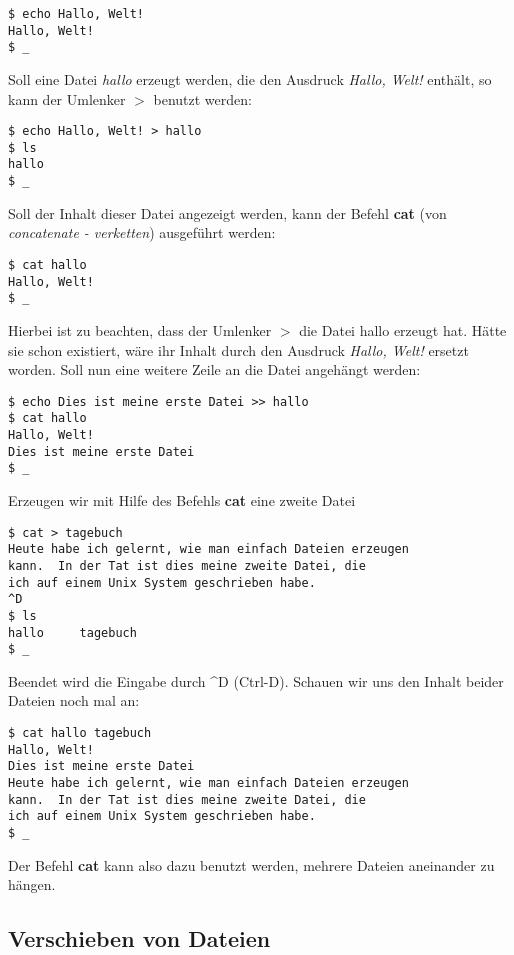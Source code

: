 \documentclass[titlepage,a4paper]{article}
\begin{document}
\begin{verbatim}
$ echo Hallo, Welt!
Hallo, Welt!
$ _
\end{verbatim}

Soll eine Datei \emph{hallo} erzeugt werden, die den Ausdruck \emph{Hallo,
  Welt!} enthält, so kann der Umlenker $>$ benutzt werden:

\begin{verbatim}
$ echo Hallo, Welt! > hallo
$ ls
hallo
$ _
\end{verbatim}

Soll der Inhalt dieser Datei angezeigt werden, kann der Befehl \textbf{cat}
(von \emph{concatenate - verketten}) ausgeführt werden:

\begin{verbatim}
$ cat hallo
Hallo, Welt!
$ _
\end{verbatim}

Hierbei ist zu beachten, dass der Umlenker $>$ die Datei hallo erzeugt hat.
Hätte sie schon existiert, wäre ihr Inhalt durch den Ausdruck \emph{Hallo,
  Welt!} ersetzt worden.  Soll nun eine weitere Zeile an die Datei angehängt
werden: 

\begin{verbatim}
$ echo Dies ist meine erste Datei >> hallo
$ cat hallo
Hallo, Welt!
Dies ist meine erste Datei
$ _
\end{verbatim}

Erzeugen wir mit Hilfe des Befehls \textbf{cat} eine zweite Datei

\begin{verbatim}
$ cat > tagebuch
Heute habe ich gelernt, wie man einfach Dateien erzeugen
kann.  In der Tat ist dies meine zweite Datei, die
ich auf einem Unix System geschrieben habe.
^D
$ ls
hallo     tagebuch
$ _
\end{verbatim}

Beendet wird die Eingabe durch \^{}D (Ctrl-D).  Schauen wir uns den Inhalt
beider Dateien noch mal an:

\begin{verbatim}
$ cat hallo tagebuch
Hallo, Welt!
Dies ist meine erste Datei
Heute habe ich gelernt, wie man einfach Dateien erzeugen
kann.  In der Tat ist dies meine zweite Datei, die
ich auf einem Unix System geschrieben habe.
$ _
\end{verbatim}

Der Befehl \textbf{cat} kann also dazu benutzt werden, mehrere Dateien
aneinander zu hängen.

\subsection{Verschieben von Dateien}
\label{sec:mv}
\end{document}

